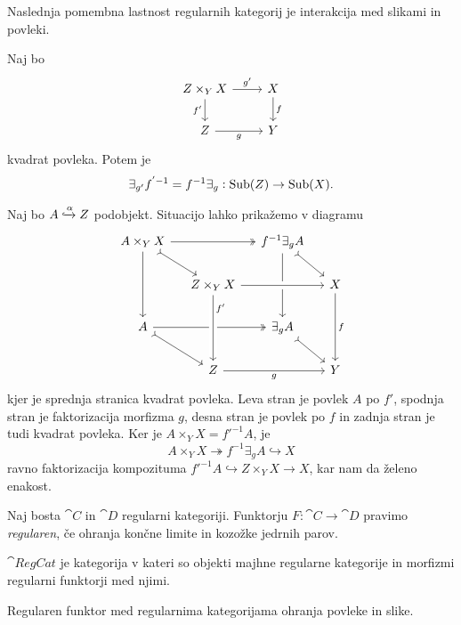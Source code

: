 \documentclass[../kategoricna_logika.tex]{subfiles}
\begin{document}
Naslednja pomembna lastnost regularnih kategorij je interakcija med
slikami in povleki.
\begin{lema}\label{lema:zamenjava-povleka-in-slike}
  Naj bo
  \begin{equation*}
    \begin{tikzcd}
      Z \times_Y X \ar[d, "f'"'] \ar[r, "g'"] & X \ar[d, "f"] \\
      Z \ar[r, "g"'] & Y
    \end{tikzcd}
  \end{equation*}
  kvadrat povleka. Potem je
  $$\exists_{g'}f^{'-1} = f^{-1}\exists_g : \operatorname{Sub}(Z) \to \operatorname{Sub}(X).$$
\end{lema}
\begin{dokaz}
  Naj bo $A \xhookrightarrow{\alpha} Z$ podobjekt.  Situacijo lahko
  prikažemo v diagramu
  \begin{equation*}
    \begin{tikzcd}[column sep=small]
      A \times_Y X \ar[dd] \ar[dr, tail] \ar[rr, two heads] & &
      f^{-1}\exists_g A \ar[dd] \ar[dr, tail] & \\
      & Z \times_Y X  \ar[rr, crossing over] & & X \ar[dd, "f"] \\
      A \ar[dr, tail] \ar[rr, two heads] & & \exists_g A \ar[dr, tail] & \\
      & Z \ar[rr, "g"'] \ar[from=uu, pos=0.2, crossing over, "f'"] & &
      Y
    \end{tikzcd}
  \end{equation*}
  kjer je sprednja stranica kvadrat povleka.  Leva stran je povlek $A$
  po $f'$, spodnja stran je faktorizacija morfizma $g$, desna stran je
  povlek po $f$ in zadnja stran je tudi kvadrat povleka.  Ker je
  $A \times_Y X = f'^{-1}A$, je
  \[A \times_Y X \twoheadrightarrow f^{-1}\exists_g A \hookrightarrow
    X\] ravno faktorizacija kompozituma
  $f'^{-1}A \hookrightarrow Z \times_Y X \to X$, kar nam da želeno
  enakost.
\end{dokaz}
\begin{definicija}
  Naj bosta $\cat{C}$ in $\cat{D}$ regularni kategoriji.  Funktorju
  ${F : \cat{C} \to \cat{D}}$ pravimo \emph{regularen}, če ohranja
  končne limite in kozožke jedrnih parov.
\end{definicija}
\begin{definicija}
  $\cat{RegCat}$ je kategorija v kateri so objekti majhne regularne
  kategorije in morfizmi regularni funktorji med njimi.
\end{definicija}
\begin{lema}
  Regularen funktor med regularnima kategorijama ohranja povleke in
  slike.
\end{lema}
\end{document}
